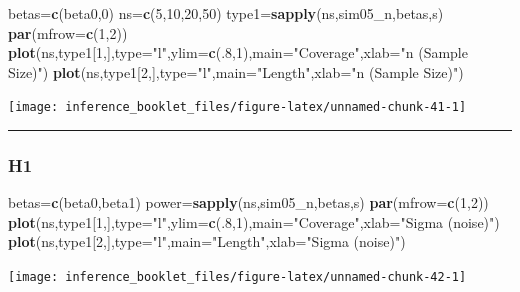 \documentclass[]{article}
\newenvironment{Shaded}{\begin{snugshade}}{\end{snugshade}}
\newcommand{\KeywordTok}[1]{\textcolor[rgb]{0.13,0.29,0.53}{\textbf{#1}}}
\newcommand{\DataTypeTok}[1]{\textcolor[rgb]{0.13,0.29,0.53}{#1}}
\newcommand{\DecValTok}[1]{\textcolor[rgb]{0.00,0.00,0.81}{#1}}
\newcommand{\StringTok}[1]{\textcolor[rgb]{0.31,0.60,0.02}{#1}}
\newcommand{\NormalTok}[1]{#1}
\begin{document}
\begin{Shaded}
\begin{Highlighting}[]
\NormalTok{betas=}\KeywordTok{c}\NormalTok{(beta0,}\DecValTok{0}\NormalTok{)}
\NormalTok{ns=}\KeywordTok{c}\NormalTok{(}\DecValTok{5}\NormalTok{,}\DecValTok{10}\NormalTok{,}\DecValTok{20}\NormalTok{,}\DecValTok{50}\NormalTok{)}
\NormalTok{type1=}\KeywordTok{sapply}\NormalTok{(ns,sim05_n,betas,s)}
\KeywordTok{par}\NormalTok{(}\DataTypeTok{mfrow=}\KeywordTok{c}\NormalTok{(}\DecValTok{1}\NormalTok{,}\DecValTok{2}\NormalTok{))}
\KeywordTok{plot}\NormalTok{(ns,type1[}\DecValTok{1}\NormalTok{,],}\DataTypeTok{type=}\StringTok{"l"}\NormalTok{,}\DataTypeTok{ylim=}\KeywordTok{c}\NormalTok{(.}\DecValTok{8}\NormalTok{,}\DecValTok{1}\NormalTok{),}\DataTypeTok{main=}\StringTok{"Coverage"}\NormalTok{,}\DataTypeTok{xlab=}\StringTok{"n (Sample Size)"}\NormalTok{)}
\KeywordTok{plot}\NormalTok{(ns,type1[}\DecValTok{2}\NormalTok{,],}\DataTypeTok{type=}\StringTok{"l"}\NormalTok{,}\DataTypeTok{main=}\StringTok{"Length"}\NormalTok{,}\DataTypeTok{xlab=}\StringTok{"n (Sample Size)"}\NormalTok{)}
\end{Highlighting}
\end{Shaded}

\begin{center}\texttt{[image: inference\_booklet\_files/figure-latex/unnamed-chunk-41-1]} \end{center}

\begin{center}\rule{0.5\linewidth}{\linethickness}\end{center}

\subsubsection{H1}\label{h1-2}

\begin{Shaded}
\begin{Highlighting}[]
\NormalTok{betas=}\KeywordTok{c}\NormalTok{(beta0,beta1)}
\NormalTok{power=}\KeywordTok{sapply}\NormalTok{(ns,sim05_n,betas,s)}
\KeywordTok{par}\NormalTok{(}\DataTypeTok{mfrow=}\KeywordTok{c}\NormalTok{(}\DecValTok{1}\NormalTok{,}\DecValTok{2}\NormalTok{))}
\KeywordTok{plot}\NormalTok{(ns,type1[}\DecValTok{1}\NormalTok{,],}\DataTypeTok{type=}\StringTok{"l"}\NormalTok{,}\DataTypeTok{ylim=}\KeywordTok{c}\NormalTok{(.}\DecValTok{8}\NormalTok{,}\DecValTok{1}\NormalTok{),}\DataTypeTok{main=}\StringTok{"Coverage"}\NormalTok{,}\DataTypeTok{xlab=}\StringTok{"Sigma (noise)"}\NormalTok{)}
\KeywordTok{plot}\NormalTok{(ns,type1[}\DecValTok{2}\NormalTok{,],}\DataTypeTok{type=}\StringTok{"l"}\NormalTok{,}\DataTypeTok{main=}\StringTok{"Length"}\NormalTok{,}\DataTypeTok{xlab=}\StringTok{"Sigma (noise)"}\NormalTok{)}
\end{Highlighting}
\end{Shaded}

\begin{center}\texttt{[image: inference\_booklet\_files/figure-latex/unnamed-chunk-42-1]} \end{center}
\end{document}
